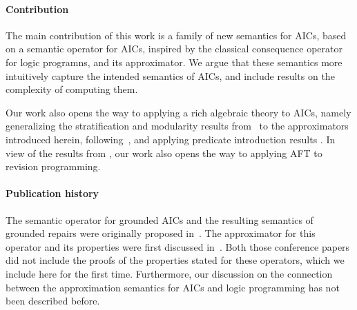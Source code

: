 
\paragraph{Contribution}
The main contribution of this work is a family of new semantics for AICs, based on a semantic operator for AICs, inspired by the classical consequence operator for logic programns, and its approximator.
We argue that these semantics more intuitively capture the intended semantics of AICs, and include results on the complexity of computing them.

Our work also opens the way to applying a rich algebraic theory to AICs, namely generalizing the stratification and modularity results from~\cite{foiks/Cruz-Filipe14,iclp/Cruz-Filipe16} to the approximators introduced herein, following~\cite{tocl/VennekensGD06,tocl/BogaertsVD16}, and applying predicate introduction results \cite{VennekensMWD07a,VennekensMWD07b}.
In view of the results from \citet{tplp/CaropreseT11}, our work also opens the way to applying AFT to revision programming.


\paragraph{Publication history}
The semantic operator for grounded AICs and the resulting semantics of grounded repairs were originally proposed in~\cite{iclp/Cruz-Filipe16}.
The approximator for this operator and its properties were first discussed in~\cite{icalp/Bogaerts17}.
Both those conference papers did not include the proofs of the properties stated for these operators, which we include here for the first time.
Furthermore, our discussion on the connection between the approximation semantics for AICs and logic programming has not been described before.


